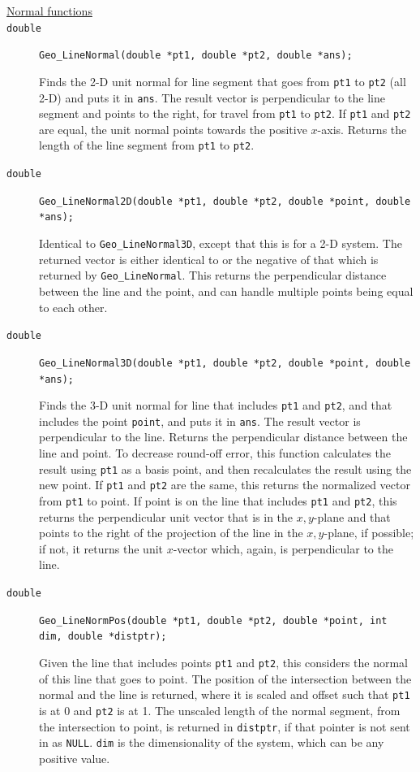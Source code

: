 \documentclass[11pt]{article}
\newcommand {\ttt} {\texttt}
\begin{document}
\begin{description}
\item[\underline{Normal functions}]

\item[\ttt{double}]
\ttt{Geo\_LineNormal(double *pt1, double *pt2, double *ans);}

Finds the 2-D unit normal for line segment that goes from \ttt{pt1} to \ttt{pt2} (all 2-D) and puts it in \ttt{ans}. The result vector is perpendicular to the line segment and points to the right, for travel from \ttt{pt1} to \ttt{pt2}. If \ttt{pt1} and \ttt{pt2} are equal, the unit normal points towards the positive $x$-axis. Returns the length of the line segment from \ttt{pt1} to \ttt{pt2}.

\item[\ttt{double}]
\ttt{Geo\_LineNormal2D(double *pt1, double *pt2, double *point, double *ans);}

Identical to \ttt{Geo\_LineNormal3D}, except that this is for a 2-D system. The returned vector is either identical to or the negative of that which is returned by \ttt{Geo\_LineNormal}. This returns the perpendicular distance between the line and the point, and can handle multiple points being equal to each other.

\item[\ttt{double}]
\ttt{Geo\_LineNormal3D(double *pt1, double *pt2, double *point, double *ans);}

Finds the 3-D unit normal for line that includes \ttt{pt1} and \ttt{pt2}, and that includes the point \ttt{point}, and puts it in \ttt{ans}. The result vector is perpendicular to the line. Returns the perpendicular distance between the line and point. To decrease round-off error, this function calculates the result using \ttt{pt1} as a basis point, and then recalculates the result using the new point. If \ttt{pt1} and \ttt{pt2} are the same, this returns the normalized vector from \ttt{pt1} to point. If point is on the line that includes \ttt{pt1} and \ttt{pt2}, this returns the perpendicular unit vector that is in the $x,y$-plane and that points to the right of the projection of the line in the $x,y$-plane, if possible; if not, it returns the unit $x$-vector which, again, is perpendicular to the line.

\item[\ttt{double}]
\ttt{Geo\_LineNormPos(double *pt1, double *pt2, double *point, int dim, double *distptr);}

Given the line that includes points \ttt{pt1} and \ttt{pt2}, this considers the normal of this line that goes to point. The position of the intersection between the normal and the line is returned, where it is scaled and offset such that \ttt{pt1} is at 0 and \ttt{pt2} is at 1. The unscaled length of the normal segment, from the intersection to point, is returned in \ttt{distptr}, if that pointer is not sent in as \ttt{NULL}. \ttt{dim} is the dimensionality of the system, which can be any positive value.


\end{description}
\end{document}
